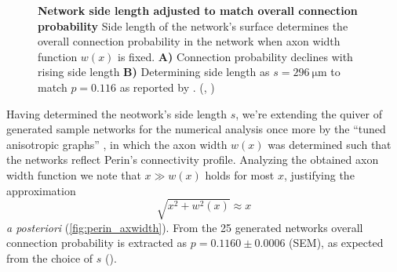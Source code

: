 \begin{figure}[htp]
  \centering
  \captionsetup{skip=7pt}
  \caption{\textbf{Network side length adjusted to match overall
      connection probability} Side length of the network's surface
    determines the overall connection probability in the network when
    axon width function $w(x)$ is fixed. \textbf{A)} Connection
    probability declines with rising side length \textbf{B)}
    Determining side length as $s=\SI{296}{\micro\meter}$ to match $p
    = 0.116$ as reported by \textcite{Song2005}. (,
    )}
  \label{fig:determine_side_length}
\end{figure}



Having determined the neotwork's side length $s$, we're extending the
quiver of generated sample networks for the numerical analysis once
more by the \enquote{tuned anisotropic graphs} , in which the axon width $w(x)$ was determined
such that the networks reflect Perin's connectivity profile. Analyzing
the obtained axon width function we note that $x \gg w(x)$ holds for
most $x$, justifying the approximation
\[
  \sqrt{x^2 + w^2(x)} \approx x
\] 
\textit{a posteriori} (\autoref{fig:perin_axwidth}). From the 25
generated networks overall connection probability is extracted as $p =
0.1160 \pm 0.0006$ (SEM), as expected from the choice of $s$
().





